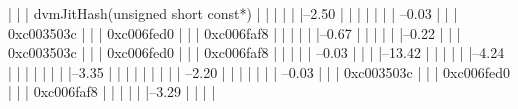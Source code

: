                           |          |          |                                dvmJitHash(unsigned short const*)
                          |          |          |          
                          |          |          |--2.50%
                          |          |          |          |          
                          |          |          |           --0.03%
                          |          |          |                     0xc003503c
                          |          |          |                     0xc006fed0
                          |          |          |                     0xc006faf8
                          |          |          |          
                          |          |          |--0.67%
                          |          |          |          
                          |          |          |--0.22%
                          |          |          |          0xc003503c
                          |          |          |          0xc006fed0
                          |          |          |          0xc006faf8
                          |          |          |          
                          |          |           --0.03%
                          |          |          
                          |          |--13.42%
                          |          |          |          
                          |          |          |--4.24%
                          |          |          |          |          
                          |          |          |          |--3.35%
                          |          |          |          |          |          
                          |          |          |          |           --2.20%
                          |          |          |          |          
                          |          |          |           --0.03%
                          |          |          |                     0xc003503c
                          |          |          |                     0xc006fed0
                          |          |          |                     0xc006faf8
                          |          |          |          
                          |          |          |--3.29%
                          |          |          |          |          
